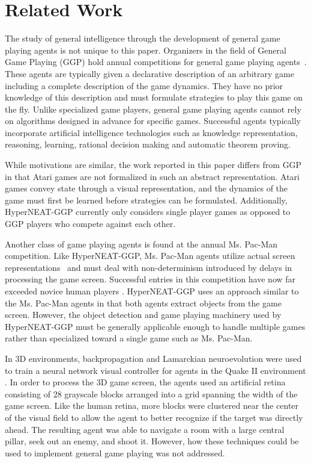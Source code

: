\documentclass{sig-alternate}
\begin{document}
\section{Related Work}
\label{sec:background}
The study of general intelligence through the development of general game playing agents is not unique to this paper. Organizers in the field of General Game Playing (GGP) hold annual competitions for general game playing agents~\cite{genesereth05}. These agents are typically given a declarative description of an arbitrary game including a complete description of the game dynamics. They have no prior knowledge of this description and must formulate strategies to play this game on the fly. Unlike specialized game players, general game playing agents cannot rely on algorithms designed in advance for specific games. Successful agents typically incorporate artificial intelligence technologies such as knowledge representation, reasoning, learning, rational decision making and automatic theorem proving. 

While motivations are similar, the work reported in this paper differs from GGP in that Atari games are not formalized in such an abstract representation. Atari games convey state through a visual representation, and the dynamics of the game must first be learned before strategies can be formulated. Additionally, HyperNEAT-GGP currently only considers single player games as opposed to GGP players who compete against each other.

Another class of game playing agents is found at the annual Ms. Pac-Man competition. Like HyperNEAT-GGP, Ms. Pac-Man agents utilize actual screen representations~\cite{pacmancompetition} and must deal with non-determinism introduced by delays in processing the game screen. Successful entries in this competition have now far exceeded novice human players \cite{sigevolution2007}. HyperNEAT-GGP uses an approach similar to the Ms. Pac-Man agents in that both agents extract objects from the game screen. However, the object detection and game playing machinery used by HyperNEAT-GGP must be generally applicable enough to handle multiple games rather than specialized toward a single game such as Ms. Pac-Man.

In 3D environments, backpropagation and Lamarckian neuroevolution were used to train a neural network visual controller for agents in the Quake II environment \cite{parker09}. In order to process the 3D game screen, the agents used an artificial retina consisting of 28 grayscale blocks arranged into a grid spanning the width of the game screen. Like the human retina, more blocks were clustered near the center of the visual field to allow the agent to better recognize if the target was directly ahead. The resulting agent was able to navigate a room with a large central pillar, seek out an enemy, and shoot it. However, how these techniques could be used to implement general game playing was not addressed.
\end{document}
